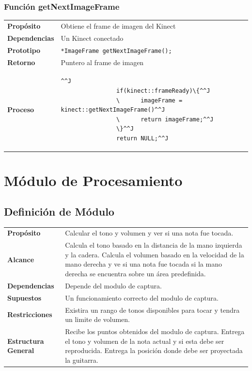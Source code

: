 \documentclass[a4paper,12pt]{article}
\begin{document}
\subsubsection{Función getNextImageFrame}
\begin{tabularx}{\textwidth}{p{25mm} X}
        \textbf{Propósito} & Obtiene el frame de imagen del Kinect \\
        \textbf{Dependencias} & Un Kinect conectado \\
        \textbf{Prototipo} & \lstinline{*ImageFrame getNextImageFrame();}\\
        \textbf{Retorno} & Puntero al frame de imagen \\
        \textbf{Proceso} & 
        \begin{lstlisting}[breaklines=true]^^J
                if(kinect::frameReady)\{^^J
                \      imageFrame = kinect::getNextImageFrame()^^J
                \      return imageFrame;^^J
                \}^^J
                return NULL;^^J
        \end{lstlisting} \\
\end{tabularx}

\section{Módulo de Procesamiento}
\label{sec:procesamiento}
\subsection{Definición de Módulo}
\begin{tabularx}{\textwidth}{p{25mm} X}
        \textbf{Propósito} & Calcular el tono y volumen y ver si una nota fue tocada.\\
        \textbf{Alcance} & Calcula el tono basado en la distancia de la mano izquierda y la cadera. Calcula el volumen basado en la velocidad de la mano derecha y ve si una nota fue tocada si la mano derecha se encuentra sobre un área predefinida.\\
        \textbf{Dependencias} & Depende del modulo de captura.\\
        \textbf{Supuestos} & Un funcionamiento correcto del modulo de captura.\\
        \textbf{Restricciones} & Existira un rango de tonos disponibles para tocar y tendra un limite de volumen.\\
        \textbf{Estructura General} & Recibe los puntos obtenidos del modulo de captura. Entrega el tono y volumen de la nota actual y si esta debe ser reproducida. Entrega la posición donde debe ser proyectada la guitarra. \\
\end{tabularx}
\end{document}
